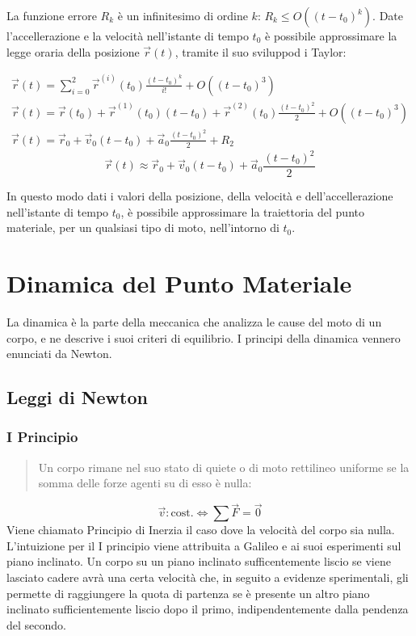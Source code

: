 \documentclass{article}
\numberwithin{equation}{subsection}
\begin{document}
La funzione errore $R_k$ è un infinitesimo di ordine $k$: 
$R_k \leq O((t-t_0)^{k})$.
Date l'accellerazione e la velocità nell'istante di tempo $t_0$ è possibile approssimare la legge oraria della posizione $\vec{r}(t)$, tramite il suo sviluppod i Taylor: 

\begin{gather*}
    \vec{r}(t)=\sum_{i=0}^{2}\displaystyle\vec{r}^{(i)}(t_0)\frac{(t-t_0)^k}{i!}+O((t-t_0)^{3})\\
    \vec{r}(t)=\vec{r}(t_0) + \vec{r}^{(1)}(t_0)(t-t_0)+\vec{r}^{(2)}(t_0)\displaystyle\frac{(t-t_0)^{2}}{2}+O((t-t_0)^{3})\\
    {\vec{r}}(t)=\vec{r}_0+\vec{v}_0(t-t_0)+\vec{a}_0\displaystyle\frac{(t-t_0)^{2}}{2}+R_2
\end{gather*}
\begin{equation}
    {\vec{r}}(t)\approx\vec{r}_0+\vec{v}_0(t-t_0)+\vec{a}_0\displaystyle\frac{(t-t_0)^{2}}{2}
\end{equation}

In questo modo dati i valori della posizione, della velocità 
e dell'accellerazione nell'istante di tempo $t_0$, è possibile 
approssimare la traiettoria del punto materiale, per un qualsiasi tipo di moto, nell'intorno di $t_0$.

\clearpage

\section{Dinamica del Punto Materiale}
La dinamica è la parte della meccanica che analizza le cause del moto di un corpo, e ne descrive i suoi criteri di equilibrio. I principi della dinamica vennero 
enunciati da Newton. 

\subsection{Leggi di Newton}

\subsubsection{I Principio}
\begin{quotation}
    Un corpo rimane nel suo stato di quiete o di moto rettilineo 
    uniforme se la somma delle forze agenti su di esso è nulla:
\end{quotation}
\begin{equation}
    \vec{v}:\mbox{cost.}\iff \sum\vec{F}=\vec{0}
\end{equation}
Viene chiamato Principio di Inerzia il caso dove la velocità 
del corpo sia nulla.
L'intuizione per il I principio viene attribuita a Galileo 
e ai suoi esperimenti sul piano inclinato. Un corpo su un piano 
inclinato sufficentemente liscio se viene lasciato cadere 
avrà una certa velocità che, in seguito a evidenze sperimentali,
gli permette di raggiungere la quota di partenza 
se è presente un altro piano inclinato sufficientemente liscio dopo il primo, indipendentemente dalla pendenza del secondo. 
\end{document}
